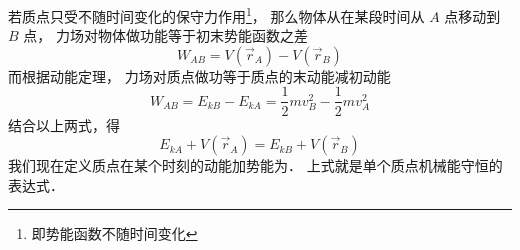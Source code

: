 

若质点只受不随时间变化的保守力作用\footnote{即势能函数不随时间变化}， 那么物体从在某段时间从 $A$ 点移动到 $B$ 点， 力场对物体做功能等于初末势能函数之差
\begin{equation}
W_{AB} = V(\vec r_A) - V(\vec r_B)
\end{equation}
而根据动能定理， 力场对质点做功等于质点的末动能减初动能
\begin{equation}
W_{AB} = E_{kB} - E_{kA} = \frac 12 m v_B^2 - \frac 12 m v_A^2
\end{equation}
结合以上两式，得
\begin{equation}
E_{kA} + V(\vec r_A) = E_{kB} + V(\vec r_B)
\end{equation}
我们现在定义质点在某个时刻的动能加势能为． 上式就是单个质点机械能守恒的表达式．